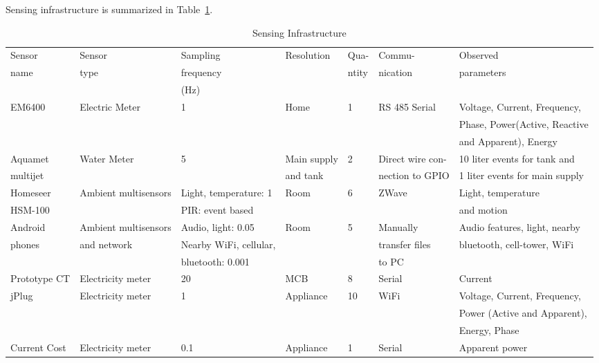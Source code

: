 \documentclass[10pt]{sensys-proc}
\newcommand{\tabref}[1]{Table~\ref{#1}}
\begin{document}
\noindent Sensing infrastructure is summarized in \tabref{tab:sensing}.


\begin{table}
\caption{Sensing Infrastructure}

\label{tab:sensing}
\tabcolsep=0.015cm
\begin{tabular}{|l|l|l|l|l|l|l|}
\hline
Sensor&Sensor&Sampling&Resolution&Qua-&Commu-&Observed\\
name&type&frequency&&ntity&nication&parameters\\
&&(Hz)&&&&\\
\hline

EM6400&Electric Meter&1&Home&1&RS 485 Serial&Voltage, Current, Frequency,\\ 
&&&&&&Phase, Power(Active, Reactive \\ 
&&&&&&and Apparent), Energy\\ \hline
Aquamet &Water Meter&5&Main supply&2&Direct wire con-&10 liter events for tank and \\ 
multijet&&& and tank&&nection to GPIO&1 liter events for main supply\\ \hline
Homeseer &Ambient multisensors&Light, temperature: 1&Room &6&ZWave&Light, temperature\\ 
     HSM-100           &&PIR: event based&&&& and motion\\ \hline
Android&Ambient multisensors&Audio, light: 0.05&Room&5&Manually&Audio features, light, nearby \\ 
phones&and network&Nearby WiFi, cellular,&&&transfer files&bluetooth, cell-tower, WiFi\\ 
&& bluetooth: 0.001&&&to PC&\\ \hline
Prototype CT&Electricity meter&20&MCB&8&Serial&Current \\\hline
jPlug&Electricity meter & 1 &Appliance&10&WiFi&Voltage, Current, Frequency,\\ 
&&&&&&Power (Active and Apparent),\\
&&&&&& Energy, Phase\\ \hline	
Current Cost&Electricity meter&0.1&Appliance&1&Serial&Apparent power\\ \hline


\end{tabular}


\end{table}
\end{document}
